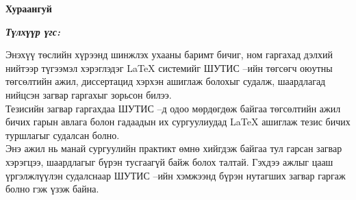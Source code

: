 

\begin{center}
{\scshape\Large \univname\par} %
{\scshape\large \facname\par}\vspace{0.5cm} %
{\huge\textbf{{Хураангуй}} \par}
\bigskip
{\Large{\ttitle} \par} %
\bigskip

{\normalsize \shortname \par} %
\addressname
\end{center}

\textit{\textbf{Түлхүүр үгс: \keywordnames}}
\bigskip

Энэхүү төслийн хүрээнд шинжлэх ухааны баримт бичиг, ном гаргахад дэлхий нийтээр түгээмэл хэрэглэдэг \LaTeX{} системийг ШУТИС --ийн төгсөгч оюутны төгсөлтийн ажил, диссертацид хэрхэн ашиглаж болохыг судалж, шаардлагад нийцсэн загвар гаргахыг зорьсон билээ. \\

Тезисийн загвар гаргахдаа ШУТИС --д одоо мөрдөгдөж байгаа төгсөлтийн ажил бичих гарын авлага болон гадаадын их сургуулиудад \LaTeX{} ашиглаж тезис бичих туршлагыг судалсан болно.\\

Энэ ажил нь манай сургуулийн практикт өмнө хийгдэж байгаа тул гарсан загвар хэрэгцээ, шаардлагыг бүрэн тусгаагүй байж болох талтай. Гэхдээ ажлыг цааш үргэлжлүүлэн судалснаар ШУТИС --ийн хэмжээнд бүрэн нутагших загвар гаргаж болно гэж үзэж байна.



